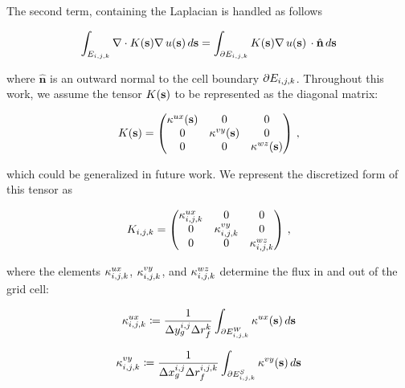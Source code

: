 The second term, containing the Laplacian is handled as follows
\begin{linenomath*}\begin{equation*}
    \int_{E_{i,j,k}} \nabla\cdot K(\mathbf{s})\nabla\,u(\mathbf{s})\,d\mathbf{s}
    =\int_{\partial E_{i,j,k}} K(\mathbf{s})\nabla\,u(\mathbf{s})\,
    \cdot \hat{\mathbf{n}} \, d\mathbf{s}
\end{equation*}\end{linenomath*}
where $\hat{\mathbf{n}}$ is an outward normal to the cell boundary
$\partial E_{i,j,k}$.
Throughout this work, we assume the tensor $K(\mathbf{s})$ to be represented as the
diagonal matrix:
\begin{linenomath*}\begin{equation*}
    K(\mathbf{s}) =
    \begin{pmatrix}
        \kappa^{ux}(\mathbf{s}) & 0 & 0 \\
        0 &\kappa^{vy}(\mathbf{s}) & 0 \\
        0 & 0 & \kappa^{wz}(\mathbf{s}) \\
    \end{pmatrix} \, ,
\end{equation*}\end{linenomath*}
which could be generalized in future work.
We represent the discretized form of this tensor as
\begin{linenomath*}\begin{equation*}
    K_{i,j,k} =
    \begin{pmatrix}
        \kappa^{ux}_{i,j,k} & 0 & 0 \\
        0 & \kappa^{vy}_{i,j,k} & 0 \\
        0 & 0 & \kappa^{wz}_{i,j,k} \\
    \end{pmatrix} \, ,
\end{equation*}\end{linenomath*}
where the elements $\kappa^{ux}_{i,j,k}$, $\kappa^{vy}_{i,j,k}$, and $\kappa^{wz}_{i,j,k}$
determine the flux in and out of the grid cell:
\begin{linenomath*}\begin{equation*}
    \kappa^{ux}_{{i,j,k}} \coloneqq \dfrac{1}{\Delta y_g^{i,j}\Delta r_f^{k}}
    \int_{\partial E_{{i,j,k}}^{W}} \kappa^{ux}(\mathbf{s})\,d\mathbf{s}
\end{equation*}\end{linenomath*}
\begin{linenomath*}\begin{equation*}
    \kappa^{vy}_{{i,j,k}} \coloneqq \dfrac{1}{\Delta x_g^{i,j}\Delta r_f^{{i,j,k}}}
    \int_{\partial E_{{i,j,k}}^{S}} \kappa^{vy}(\mathbf{s})\,d\mathbf{s}
\end{equation*}\end{linenomath*}

